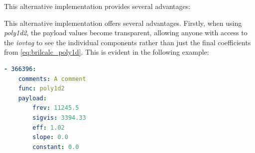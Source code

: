 This alternative implementation provides several advantages:






This alternative implementation offers several advantages. Firstly, when using \textit{poly1d2}, the payload values become transparent, allowing anyone with access to the \textit{iovtag} to see the individual components rather than just the final coefficients from \autoref{eq:brilcalc_poly1d}. This is evident in the following example:

\begin{lstlisting}[language=Yaml]
- 366396:
    comments: A comment
    func: poly1d2
    payload:
        frev: 11245.5
        sigvis: 3394.33
        eff: 1.02
        slope: 0.0
        constant: 0.0
\end{lstlisting}


